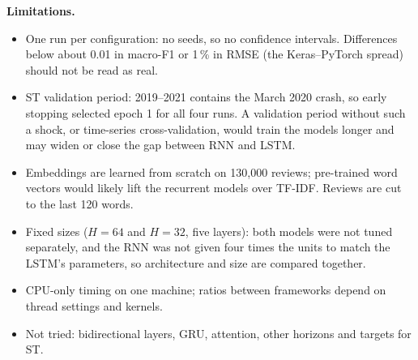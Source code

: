 \documentclass[11pt, a4paper]{article}
\begin{document}
\textbf{Limitations.}
\begin{itemize}
\item One run per configuration: no seeds, so no confidence intervals. Differences below about 0.01 in macro-F1 or 1\,\% in RMSE (the Keras--PyTorch spread) should not be read as real.
\item ST validation period: 2019--2021 contains the March 2020 crash, so early stopping selected epoch 1 for all four runs. A validation period without such a shock, or time-series cross-validation, would train the models longer and may widen or close the gap between RNN and LSTM.
\item Embeddings are learned from scratch on 130{,}000 reviews; pre-trained word vectors would likely lift the recurrent models over TF-IDF. Reviews are cut to the last 120 words.
\item Fixed sizes ($H=64$ and $H=32$, five layers): both models were not tuned separately, and the RNN was not given four times the units to match the LSTM's parameters, so architecture and size are compared together.
\item CPU-only timing on one machine; ratios between frameworks depend on thread settings and kernels.
\item Not tried: bidirectional layers, GRU, attention, other horizons and targets for ST.
\end{itemize}

\appendix
\end{document}
